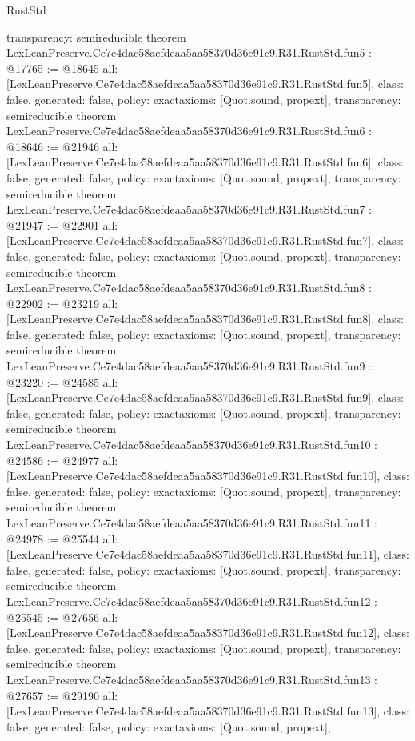 \begin{lexlean}{RustStd}
\begin{coremodule}
{  transparency: semireducible
}
theorem LexLeanPreserve.Ce7e4dac58aefdeaa5aa58370d36e91c9.R31.RustStd.fun5 : @17765 := @18645 {
  all: [LexLeanPreserve.Ce7e4dac58aefdeaa5aa58370d36e91c9.R31.RustStd.fun5],
  class: false,
  generated: false,
  policy: exact{axioms: [Quot.sound, propext]},
  transparency: semireducible
}
theorem LexLeanPreserve.Ce7e4dac58aefdeaa5aa58370d36e91c9.R31.RustStd.fun6 : @18646 := @21946 {
  all: [LexLeanPreserve.Ce7e4dac58aefdeaa5aa58370d36e91c9.R31.RustStd.fun6],
  class: false,
  generated: false,
  policy: exact{axioms: [Quot.sound, propext]},
  transparency: semireducible
}
theorem LexLeanPreserve.Ce7e4dac58aefdeaa5aa58370d36e91c9.R31.RustStd.fun7 : @21947 := @22901 {
  all: [LexLeanPreserve.Ce7e4dac58aefdeaa5aa58370d36e91c9.R31.RustStd.fun7],
  class: false,
  generated: false,
  policy: exact{axioms: [Quot.sound, propext]},
  transparency: semireducible
}
theorem LexLeanPreserve.Ce7e4dac58aefdeaa5aa58370d36e91c9.R31.RustStd.fun8 : @22902 := @23219 {
  all: [LexLeanPreserve.Ce7e4dac58aefdeaa5aa58370d36e91c9.R31.RustStd.fun8],
  class: false,
  generated: false,
  policy: exact{axioms: [Quot.sound, propext]},
  transparency: semireducible
}
theorem LexLeanPreserve.Ce7e4dac58aefdeaa5aa58370d36e91c9.R31.RustStd.fun9 : @23220 := @24585 {
  all: [LexLeanPreserve.Ce7e4dac58aefdeaa5aa58370d36e91c9.R31.RustStd.fun9],
  class: false,
  generated: false,
  policy: exact{axioms: [Quot.sound, propext]},
  transparency: semireducible
}
theorem LexLeanPreserve.Ce7e4dac58aefdeaa5aa58370d36e91c9.R31.RustStd.fun10 : @24586 := @24977 {
  all: [LexLeanPreserve.Ce7e4dac58aefdeaa5aa58370d36e91c9.R31.RustStd.fun10],
  class: false,
  generated: false,
  policy: exact{axioms: [Quot.sound, propext]},
  transparency: semireducible
}
theorem LexLeanPreserve.Ce7e4dac58aefdeaa5aa58370d36e91c9.R31.RustStd.fun11 : @24978 := @25544 {
  all: [LexLeanPreserve.Ce7e4dac58aefdeaa5aa58370d36e91c9.R31.RustStd.fun11],
  class: false,
  generated: false,
  policy: exact{axioms: [Quot.sound, propext]},
  transparency: semireducible
}
theorem LexLeanPreserve.Ce7e4dac58aefdeaa5aa58370d36e91c9.R31.RustStd.fun12 : @25545 := @27656 {
  all: [LexLeanPreserve.Ce7e4dac58aefdeaa5aa58370d36e91c9.R31.RustStd.fun12],
  class: false,
  generated: false,
  policy: exact{axioms: [Quot.sound, propext]},
  transparency: semireducible
}
theorem LexLeanPreserve.Ce7e4dac58aefdeaa5aa58370d36e91c9.R31.RustStd.fun13 : @27657 := @29190 {
  all: [LexLeanPreserve.Ce7e4dac58aefdeaa5aa58370d36e91c9.R31.RustStd.fun13],
  class: false,
  generated: false,
  policy: exact{axioms: [Quot.sound, propext]},
}
\end{coremodule}
\end{lexlean}
